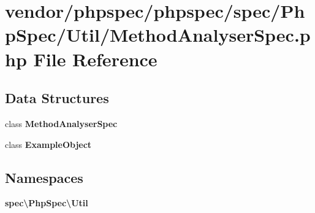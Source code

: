 \section{vendor/phpspec/phpspec/spec/\+Php\+Spec/\+Util/\+Method\+Analyser\+Spec.php File Reference}
\label{_method_analyser_spec_8php}
\subsection*{Data Structures}
\begin{DoxyCompactItemize}
\item 
class {\bf Method\+Analyser\+Spec}
\item 
class {\bf Example\+Object}
\end{DoxyCompactItemize}
\subsection*{Namespaces}
\begin{DoxyCompactItemize}
\item 
 {\bf spec\textbackslash{}\+Php\+Spec\textbackslash{}\+Util}
\end{DoxyCompactItemize}
